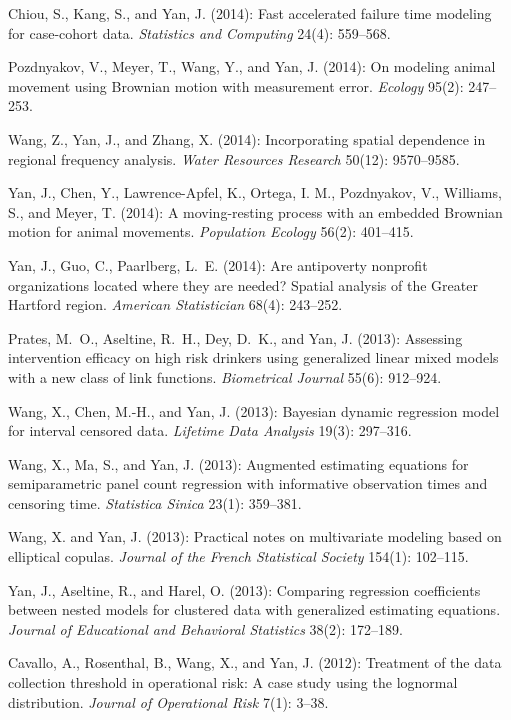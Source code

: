 \documentclass[Statistics]{vita}
\begin{document}
\begin{vita}
\begin{Publications}
\begin{RefereedJournalArticles}
  \item *Chiou, S., Kang, S., and Yan, J. (2014): Fast accelerated failure time modeling for case-cohort data. {\em Statistics and Computing\/} 24(4): 559--568.
  \item Pozdnyakov, V., Meyer, T., Wang, Y., and Yan, J. (2014): On modeling animal movement using Brownian motion with measurement error. {\em Ecology\/} 95(2): 247--253.
  \item *Wang, Z., Yan, J., and Zhang, X. (2014): Incorporating spatial dependence in regional frequency analysis. {\em Water Resources Research\/} 50(12): 9570--9585.
  \item Yan, J., Chen, Y., Lawrence-Apfel, K., Ortega, I. M., Pozdnyakov, V., Williams, S., and Meyer, T. (2014): A moving-resting process with an embedded Brownian motion for animal movements. {\em Population Ecology\/} 56(2): 401--415.
  \item Yan, J., Guo, C., Paarlberg, L.~E. (2014): Are antipoverty nonprofit organizations located where they are needed? Spatial analysis of the Greater Hartford region. {\em American Statistician\/} 68(4): 243--252.
  \item *Prates, M.~O., Aseltine, R.~H., Dey, D.~K., and Yan, J. (2013): Assessing intervention efficacy on high risk drinkers using generalized linear mixed models with a new class of link functions. {\em Biometrical Journal\/} 55(6): 912--924.
  \item *Wang, X., Chen, M.-H., and Yan, J. (2013): Bayesian dynamic regression model for interval censored data. {\em Lifetime Data Analysis\/} 19(3): 297--316.
  \item *Wang, X., Ma, S., and Yan, J. (2013): Augmented estimating equations for semiparametric panel count regression with informative observation times and censoring time. {\em Statistica Sinica\/} 23(1): 359--381.
  \item *Wang, X. and Yan, J. (2013): Practical notes on multivariate modeling based on elliptical copulas. {\em Journal of the French Statistical Society\/} 154(1): 102--115.
  \item Yan, J., Aseltine, R., and Harel, O. (2013): Comparing regression coefficients between nested models for clustered data with generalized estimating equations. {\em Journal of Educational and Behavioral Statistics\/} 38(2): 172--189.
  \item Cavallo, A., Rosenthal, B., Wang, X., and Yan, J. (2012): Treatment of the data collection threshold in operational risk: {A} case study using the lognormal distribution. {\em Journal of Operational Risk\/} 7(1): 3--38.

\end{RefereedJournalArticles}
\end{Publications}
\end{vita}
\end{document}
